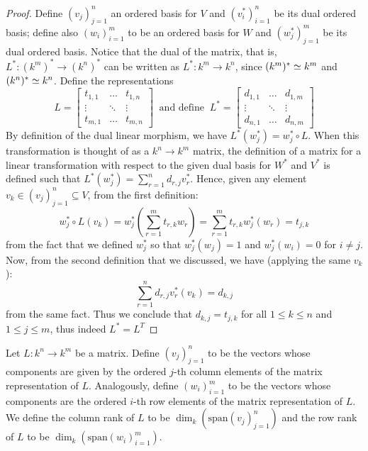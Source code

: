 \begin{proof}
  Define \((v_j)_{j=1}^n\) an ordered basis for \(V\) and \((v_i^\ast)_{i=1}^n\)
  be its dual ordered basis; define also \((w_i)_{i=1}^m\) to be an ordered
  basis for \(W\) and \((w_j^\ast)_{j=1}^m\) be its dual ordered basis. Notice
  that the dual of the matrix, that is, \(L^\ast : (k^m)^\ast \to (k^n)^\ast\)
  can be written as \(L^\ast : k^m \to k^n\), since \((k^m)^\ast \simeq k^m\) and
  \((k^n)^\ast \simeq k^n\). Define the representations
  \[
    L =
    \begin{bmatrix}
      t_{1, 1} & \dots   & t_{1, n} \\
      \vdots   & \ddots  & \vdots   \\
      t_{m, 1} & \dots   & t_{m, n}
    \end{bmatrix}
    \ \text{ and define }\
    L^\ast =
    \begin{bmatrix}
      d_{1, 1} & \dots   & d_{1, m} \\
      \vdots   & \ddots  & \vdots   \\
      d_{n, 1} & \dots   & d_{n, m}
    \end{bmatrix}
  \]
  By definition of the dual linear morphism, we have \(L^\ast(w_j^\ast) =
  w_j^\ast \circ L\). When this transformation is thought of as a \(k^n \to
  k^m\) matrix, the definition of a matrix for a linear transformation with
  respect to the given dual basis for \(W^\ast\) and \(V^\ast\) is defined such
  that \(L^\ast(w_j^\ast) = \sum_{r = 1}^n d_{r, j} v_r^\ast\). Hence, given any
  element \(v_k \in (v_j)_{j=1}^n \subseteq V\), from the first definition:
  \begin{equation}
    w_j^\ast \circ L (v_k)
    = w_j^\ast \left( \sum_{r=1}^m t_{r, k} w_r \right)
    = \sum_{r=1}^m t_{r, k} w_j^\ast(w_r)
    = t_{j, k}
  \end{equation}
  from the fact that we defined \(w_j^\ast\) so that \(w_j^\ast(w_j) = 1\) and
  \(w_j^\ast(w_i) = 0\) for \(i \neq j\). Now, from the second definition that
  we discussed, we have (applying the same \(v_k\)):
  \begin{equation}
    \sum_{r=1}^n d_{r,j} v_r^\ast(v_k)
    = d_{k, j}
  \end{equation}
  from the same fact. Thus we conclude that \(d_{k,j} = t_{j,k}\) for all \(1
  \leq k \leq n\) and \(1 \leq j \leq m\), thus indeed \(L^\ast = L^T\)
\end{proof}

\begin{definition}\label{def: column and row rank}
  Let \(L: k^n \to k^m\) be a matrix. Define \((v_j)_{j=1}^n\) to be the vectors
  whose components are given by the ordered \(j\)-th column elements of the
  matrix representation of \(L\). Analogously, define \((w_i)_{i=1}^m\) to be
  the vectors whose components are the ordered \(i\)-th row elements of the
  matrix representation of \(L\). We define the column rank of \(L\) to be
  \(\dim_k(\mathrm{span}(v_j)_{j=1}^n)\) and the row rank of \(L\) to be
  \(\dim_k(\mathrm{span}(w_i)_{i=1}^m)\).
\end{definition}

